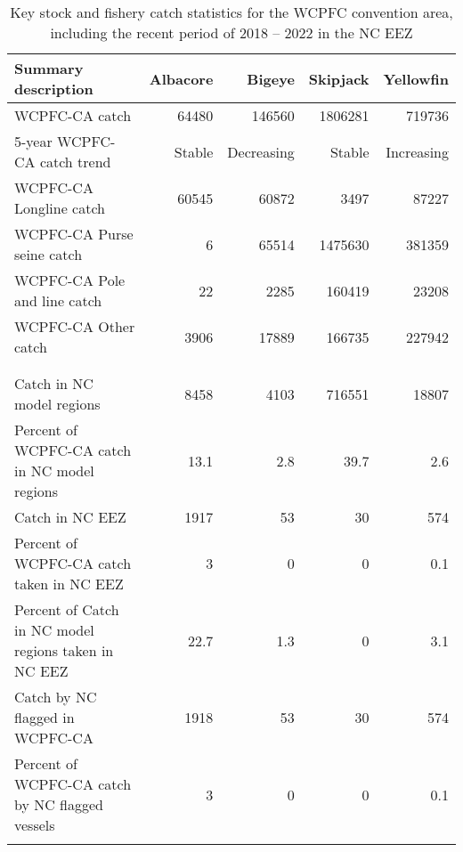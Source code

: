 \begin{longtable}{lrrrr}
\caption{Key stock and fishery catch statistics for the WCPFC convention area, including the recent period of 2018 -- 2022 in the NC EEZ} \\ 
  \hline
Summary description & Albacore & Bigeye & Skipjack & Yellowfin \\ 
  \hline
WCPFC-CA catch & 64480 & 146560 & 1806281 & 719736 \\ 
  5-year WCPFC-CA catch trend & Stable & Decreasing & Stable & Increasing \\ 
  WCPFC-CA Longline catch & 60545 & 60872 & 3497 & 87227 \\ 
  WCPFC-CA Purse seine catch & 6 & 65514 & 1475630 & 381359 \\ 
  WCPFC-CA Pole and line catch & 22 & 2285 & 160419 & 23208 \\ 
  WCPFC-CA Other catch & 3906 & 17889 & 166735 & 227942 \\ 
   &  &  &  &  \\ 
   &  &  &  &  \\ 
   \hline
Catch in NC model regions & 8458 & 4103 & 716551 & 18807 \\ 
  Percent of WCPFC-CA catch in NC model regions & 13.1 & 2.8 & 39.7 & 2.6 \\ 
  Catch in NC EEZ & 1917 & 53 & 30 & 574 \\ 
  Percent of WCPFC-CA catch taken in NC EEZ & 3 & 0 & 0 & 0.1 \\ 
  Percent of Catch in NC model regions taken in NC EEZ & 22.7 & 1.3 & 0 & 3.1 \\ 
  Catch by NC flagged in WCPFC-CA & 1918 & 53 & 30 & 574 \\ 
  Percent of WCPFC-CA catch by NC flagged vessels & 3 & 0 & 0 & 0.1 \\ 
  \hline
\label{cat_sum_tab}
\end{longtable}
